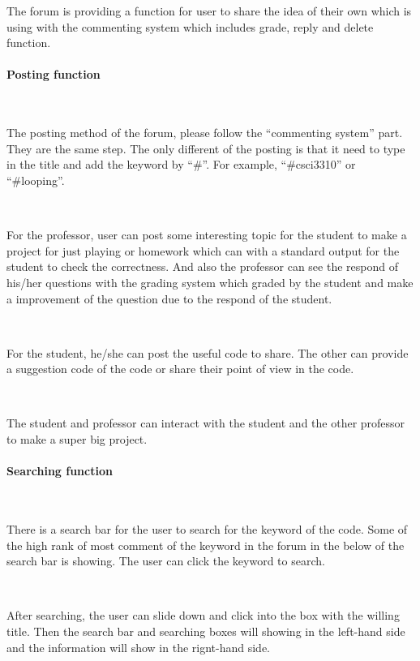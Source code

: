 The forum is providing a function for user to share the idea of their own which is using with the commenting system which includes grade, reply and delete function.

\paragraph{Posting function}~

The posting method of the forum, please follow the “commenting system” part. They are the same step. The only different of the posting is that it need to type in the title and add the keyword by “\#”. For example, “\#csci3310” or “\#looping”.\par~

For the professor, user can post some interesting topic for the student to make a project for just playing or homework which can with a standard output for the student to check the correctness. And also the professor can see the respond of his/her questions with the grading system which graded by the student and make a improvement of the question due to the respond of the student.\par~

For the student, he/she can post the useful code to share. The other can provide a suggestion code of the code or share their point of view in the code.\par~

The student and professor can interact with the student and the other professor to make a super big project.

  \paragraph{Searching function}~

There is a search bar for the user to search for the keyword of the code. Some of the high rank of most comment of the keyword in the forum in the below of the search bar is showing. The user can click the keyword to search.\par~

After searching, the user can slide down and click into the box with the willing title. Then the search bar and searching boxes will showing in the left-hand side and the information will show in the rignt-hand side.
